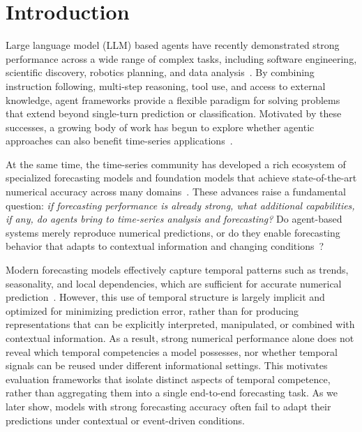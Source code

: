 \section{Introduction}

Large language model (LLM) based agents have recently demonstrated strong performance across a wide range of complex tasks, including software engineering, scientific discovery, robotics planning, and data analysis~\cite{plaat2025agentic, jimenez2023swe, boiko2023emergent, singh2024malmm}. 
By combining instruction following, multi-step reasoning, tool use, and access to external knowledge, agent frameworks provide a flexible paradigm for solving problems that extend beyond single-turn prediction or classification. 
Motivated by these successes, a growing body of work has begun to explore whether agentic approaches can also benefit time-series applications~\cite{zhao2025timeseriesscientist, zhang2024large, yeh2025empowering}.

At the same time, the time-series community has developed a rich ecosystem of specialized forecasting models and foundation models that achieve state-of-the-art numerical accuracy across many domains~\cite{cao2025timedit, ansari2024chronos, yang2025foundation, cao2023tempo}. 
These advances raise a fundamental question: \textit{if forecasting performance is already strong, what additional capabilities, if any, do agents bring to time-series analysis and forecasting?} 
Do agent-based systems merely reproduce numerical predictions, or do they enable forecasting behavior that adapts to contextual information and changing conditions~\cite{chang2025survey, chow2024towards, liu2025ts}?

Modern forecasting models effectively capture temporal patterns such as trends, seasonality, and local dependencies, which are sufficient for accurate numerical prediction~\cite{song2024deep, liu2024deep}. 
However, this use of temporal structure is largely implicit and optimized for minimizing prediction error, rather than for producing representations that can be explicitly interpreted, manipulated, or combined with contextual information. 
As a result, strong numerical performance alone does not reveal which temporal competencies a model possesses, nor whether temporal signals can be reused under different informational settings. 
This motivates evaluation frameworks that isolate distinct aspects of temporal competence, rather than aggregating them into a single end-to-end forecasting task. 
As we later show, models with strong forecasting accuracy often fail to adapt their predictions under contextual or event-driven conditions.

